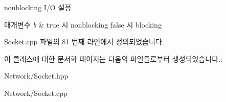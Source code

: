 nonblocking I/O 설정 


\begin{DoxyParams}{매개변수}
{\em b} & true 시 nonblocking false 시 blocking \\
\hline
\end{DoxyParams}


Socket.\+cpp 파일의 81 번째 라인에서 정의되었습니다.



이 클래스에 대한 문서화 페이지는 다음의 파일들로부터 생성되었습니다.\+:\begin{DoxyCompactItemize}
\item 
Network/Socket.\+hpp\item 
Network/Socket.\+cpp\end{DoxyCompactItemize}

